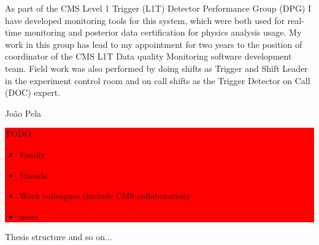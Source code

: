 \begin{declaration}
As part of the CMS Level 1 Trigger (L1T) Detector Performance Group (DPG) I have developed monitoring tools for this system, which were both used for real-time monitoring and posterior data certification for physics analysis usage. My work in this group has lead to my appointment for two years to the position of coordinator of the \gls{CMS} \gls{L1T} Data quality Monitoring software development team. Field work was also performed by doing shifts as Trigger and Shift Leader in the experiment control room and on call shifts as the Trigger Detector on Call (DOC) expert.
 
\vspace*{1cm}
\begin{flushright}
João Pela
\end{flushright}
\end{declaration}


\begin{acknowledgements}

\colorbox{red}{
\begin{minipage}{0.8\linewidth}
  
TODO:

\begin{itemize}
  \item Family
  \item Friends
  \item Work colleagues (include CMS collaboration)
  \item more
\end{itemize}

\end{minipage}
}
\end{acknowledgements}



\begin{preface}
Thesis structure and so on...
\end{preface}

\dedication{To my grand mother}


\tableofcontents

 
